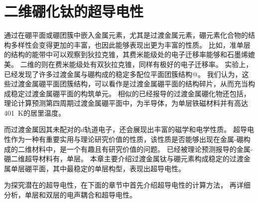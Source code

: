\chapter{二维硼化钛的超导电性}



通过在硼平面或硼团簇中嵌入金属元素，尤其是过渡金属元素，硼元素化合物的结构多样性会变得更加的丰富，也因此能够表现出更为丰富的性质。
比如，准单层的结构的能带中可以观察到狄拉克锥\cite{zhang2014prediction}，其费米能级处的电子迁移率能够和石墨烯媲美。
二维的\cite{xie2014first}则在费米能级处有双狄拉克锥，同样有极好的电子迁移率。
实验上，已经发现了许多过渡金属与硼构成的稳定多配位平面团簇结构@。
我们认为，这些过渡金属硼平面团簇结构，可以看作是过渡金属硼平面的结构碎片，从而充当构成稳定过渡金属硼平面的构筑单元。
相似的已经报导的过渡金属硼化物还包括，
理论计算预测第四周期过渡金属硼平面中，\cite{li2016global}为半导体，\cite{li2019room}为单层铁磁材料并有高达\SI{401}{\kelvin}的居里温度。

而过渡金属因其未配对的$d$轨道电子，还会展现出丰富的磁学和电学性质。
超导电性作为一种有重要实用与理论研究价值的性质，该性质是否能够出现在金属-硼构成的二维材料中，是一个有趣且有研究价值的问题。
已经被理论预测报导的金属-硼二维超导材料有\cite{yan2019prediction}，单层\cite{wu2016lithium}。
本章主要介绍过渡金属钛与硼元素构成稳定的过渡金属单层硼平面，其中最稳定的单层构型，表现出超导电性。

为探究潜在的超导电性，在下面的章节中首先介绍超导电性的计算方法，
再详细分析，单层和双层的电声耦合和超导电性。

